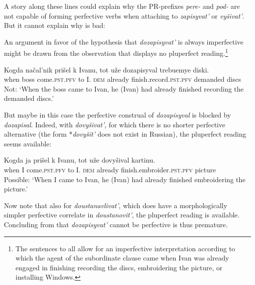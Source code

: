 \documentclass[output=paper,
colorlinks,
citecolor=brown,
newtxmath
]{langscibook}
\begin{document}
\noindent A story along these lines could explain why the PR-prefixes \textit{pere-} and \textit{pod-} are not capable of forming perfective verbs when attaching to \textit{zapisyvat'} or \textit{vyšivat'}. But it cannot explain why  is bad:

\z

\noindent An argument in favor of the hypothesis that \textit{dozapisyvat'} is always imperfective might be drawn from the observation that  displays no pluperfect reading.\footnote{The sentences  to  all allow for an imperfective interpretation according to which the agent of the subordinate clause came when Ivan was already engaged in finishing recording the discs, embroidering the picture, or installing Windows.}

\ea\label{noplusqu}
\gll Kogda načal'nik prišel k Ivanu, tot uže dozapisyval trebuemye diski.\\
when boss come.\textsc{pst.pfv} to I. \textsc{dem} already {finish.record.}\textsc{pst.pfv} demanded discs\\
\glt Not: `When the boss came to Ivan, he (Ivan) had already finished recording the demanded discs.'
\z

\noindent But maybe in this case the perfective construal of \textit{dozapisyval} is blocked by \textit{dozapisal}. Indeed, with \textit{dovyšivat'}, for which there is no shorter perfective alternative (the form *\textit{dovyšit'} does not exist in Russian), the pluperfect reading seems available:

\ea\label{yesplusqu}
\gll Kogda ja prišel k Ivanu, tot uže dovyšival kartinu.\\
when I come.\textsc{pst.pfv} to I. \textsc{dem} already
{finish.embroider.}\textsc{pst.pfv} picture\\
\glt Possible: `When I came to Ivan, he (Ivan) had already finished embroidering the picture.'
\z

\noindent Now note that also for \textit{doustanavlivat'}, which does have a morphologically simpler perfective correlate in \textit{doustanovit'},
the pluperfect reading is available. Concluding from  that \textit{dozapisyvat'} cannot be perfective is thus premature.
\end{document}
